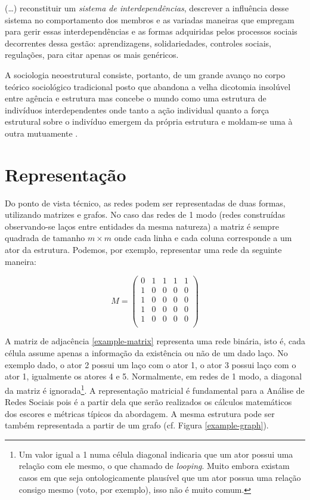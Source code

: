 \documentclass[a4paper, 12pt, openright, oneside, german, french, english, brazil]{abntex2}
\begin{document}
	\begin{citacao}
		(\dots) reconstituir um \textit{sistema de interdependências}, descrever a influência desse sistema no comportamento dos membros e as variadas maneiras que empregam para gerir essas interdependências e as formas adquiridas pelos processos sociais decorrentes dessa gestão: aprendizagens, solidariedades, controles sociais, regulações, para citar apenas os mais genéricos. \cite[p. 5]{lazega2014redes}
	\end{citacao}

	
	
	A sociologia neoestrutural consiste, portanto, de um grande avanço no corpo teórico sociológico tradicional posto que abandona a velha dicotomia insolúvel entre agência e estrutura mas concebe o mundo como uma estrutura de indivíduos interdependentes onde tanto a ação individual quanto a força estrutural sobre o indivíduo emergem da própria estrutura e moldam-se uma à outra mutuamente \cite{white2008,higgins2018analise}.
	
	\section{Representação}
	
	Do ponto de vista técnico, as redes podem ser representadas de duas formas, utilizando matrizes e grafos. No caso das redes de 1 modo (redes construídas observando-se laços entre entidades da mesma natureza) a matriz é sempre quadrada de tamanho $m \times m$ onde cada linha e cada coluna corresponde a um ator da estrutura. Podemos, por exemplo, representar uma rede da seguinte maneira:
	
	\begin{equation}
	\label{example-matrix}
	M = \begin{pmatrix}
		0 & 1 & 1 & 1 & 1 \\
		1 & 0 & 0 & 0 & 0 \\
		1 & 0 & 0 & 0 & 0 \\
		1 & 0 & 0 & 0 & 0 \\
		1 & 0 & 0 & 0 & 0 \\
	\end{pmatrix}
	\end{equation}
	
	A matriz de adjacência \ref{example-matrix} representa uma rede binária, isto é, cada célula assume apenas a informação da existência ou não de um dado laço. No exemplo dado, o ator 2 possui um laço com o ator 1, o ator 3 possui laço com o ator 1, igualmente os atores 4 e 5. Normalmente, em redes de 1 modo, a diagonal da matriz é ignorada\footnote{Um valor igual a 1 numa célula diagonal indicaria que um ator possui uma relação com ele mesmo, o que chamado de \textit{looping}. Muito embora existam casos em que seja ontologicamente plausível que um ator possua uma relação consigo mesmo (voto, por exemplo), isso não é muito comum.}. A representação matricial é fundamental para a Análise de Redes Sociais pois é a partir dela que serão realizados os cálculos matemáticos dos escores e métricas típicos da abordagem. A mesma estrutura pode ser também representada a partir de um grafo (cf. Figura \ref{example-graph}).
	
\end{document}
